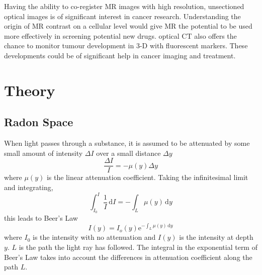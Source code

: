 	Having the ability to co-register MR images with high resolution, unsectioned optical images  is of significant  interest in cancer research. Understanding the origin of MR contrast on a cellular level would give MR the potential to be used more effectively in screening potential new drugs. optical CT also offers the chance to monitor tumour development in 3-D with fluorescent markers. These developments could be of significant help  in cancer imaging and treatment.
	
	
	
	
	
	\section{Theory}
	\label{sec:theory}
	
	
	
	
	\subsection{Radon Space}
	
	When light passes through a substance, it is assumed to be attenuated by some small amount of intensity $\Delta I$ over a small distance $\Delta y$ 
	\begin{equation}
	\dfrac{\Delta I}{I} = -\mu(y)\Delta y
	\end{equation}
	where $\mu(y)$ is the linear attenuation coefficient.
	Taking the infinitesimal limit and integrating, 
	\begin{equation}
	\int_{I_0}^{I} \frac{1}{I}\, \mathrm{d}I = - \int_L \mu(y)\, \mathrm{d}y
	\end{equation}
	this leads to Beer's Law 
	\begin{equation}
	I(y) = I_{o}(y)\mathrm{e}^{-\int_L \mu(y)\, \mathrm{d}y}
	\label{eq:Beer}
	\end{equation}
	where $I_0$ is the intensity with no attenuation and $I(y)$ is the intensity at depth $y$. $L$ is the path the light ray has followed. The integral in the exponential term of Beer's Law takes into account the differences in attenuation coefficient along the path $L$. 
	
